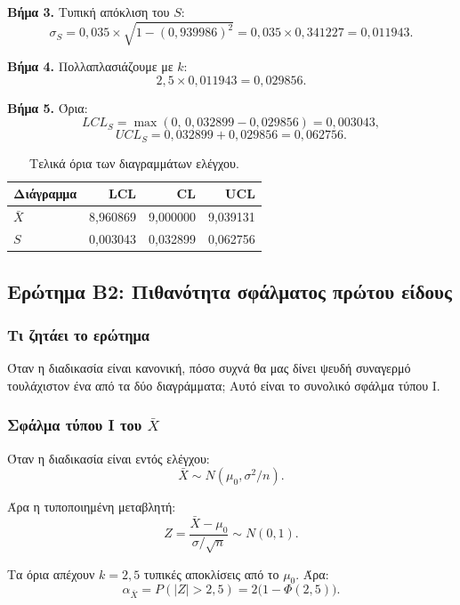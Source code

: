 \documentclass[12pt,a4paper]{article}
\begin{document}
\textbf{Βήμα 3.} Τυπική απόκλιση του \(S\):
\[
    \sigma_S=0{,}035\times\sqrt{1-(0{,}939986)^2}=0{,}035\times 0{,}341227=0{,}011943.
\]

\textbf{Βήμα 4.} Πολλαπλασιάζουμε με \(k\):
\[
    2{,}5\times 0{,}011943=0{,}029856.
\]

\textbf{Βήμα 5.} Όρια:
\[
    LCL_S=\max(0,\,0{,}032899-0{,}029856)=0{,}003043,
\]
\[
    UCL_S=0{,}032899+0{,}029856=0{,}062756.
\]

\begin{table}[H]
\centering
\caption{Τελικά όρια των διαγραμμάτων ελέγχου.}
\begin{tabular}{lrrr}
\toprule
\textbf{Διάγραμμα} & \textbf{LCL} & \textbf{CL} & \textbf{UCL} \\
\midrule
\(\bar X\) & 8,960869 & 9,000000 & 9,039131 \\
\(S\) & 0,003043 & 0,032899 & 0,062756 \\
\bottomrule
\end{tabular}
\end{table}

\subsection{Ερώτημα Β2: Πιθανότητα σφάλματος πρώτου είδους}

\subsubsection*{Τι ζητάει το ερώτημα}

Όταν η διαδικασία είναι κανονική, πόσο συχνά θα μας δίνει ψευδή συναγερμό
τουλάχιστον ένα από τα δύο διαγράμματα; Αυτό είναι το συνολικό σφάλμα
τύπου Ι.

\subsubsection*{Σφάλμα τύπου Ι του \(\bar X\)}

Όταν η διαδικασία είναι εντός ελέγχου:
\[
    \bar X\sim N(\mu_0,\sigma^2/n).
\]

Άρα η τυποποιημένη μεταβλητή:
\[
    Z=\frac{\bar X-\mu_0}{\sigma/\sqrt n}\sim N(0,1).
\]

Τα όρια απέχουν \(k=2{,}5\) τυπικές αποκλίσεις από το \(\mu_0\). Άρα:
\[
    \alpha_{\bar X}=P(|Z|>2{,}5)=2\bigl(1-\Phi(2{,}5)\bigr).
\]
\end{document}
